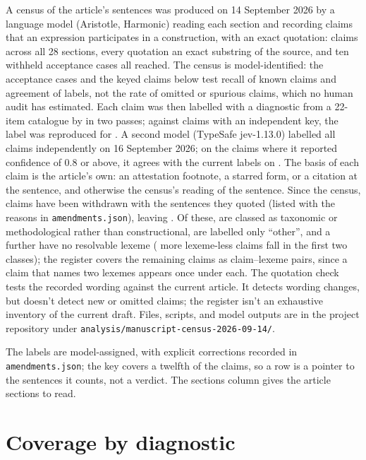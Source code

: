 \documentclass[12pt]{article}
\begin{document}
A census of the article's sentences was produced on 14 September 2026 by a language model (Aristotle, Harmonic) reading each section and recording claims that an expression participates in a construction, with an exact quotation: \censusClaims{} claims across all 28 sections, every quotation an exact substring of the source, and ten withheld acceptance cases all reached. The census is model-identified: the acceptance cases and the keyed claims below test recall of known claims and agreement of labels, not the rate of omitted or spurious claims, which no human audit has estimated. Each claim was then labelled with a diagnostic from a 22-item catalogue by  in two passes; against \keyedClaims{} claims with an independent key, the label was reproduced for \keyedAgree{}. A second model (TypeSafe jev-1.13.0) labelled all \censusClaims{} claims independently on 16 September 2026; on the \typesafeAccepted{} claims where it reported confidence of 0.8 or above, it agrees with the current labels on \typesafeAgree{}. The basis of each claim is the article's own: an attestation footnote, a starred form, or a citation at the sentence, and otherwise the census's reading of the sentence. Since the census, \withdrawnClaims{} claims have been withdrawn with the sentences they quoted (listed with the reasons in \texttt{amendments.json}), leaving \liveClaims{}. Of these, \taxonomicClaims{} are classed as taxonomic or methodological rather than constructional, \otherClaims{} are labelled only \enquote{other}, and a further \lexemelessOnly{} have no resolvable lexeme (\lexemelessOverlap{} more lexeme-less claims fall in the first two classes); the register covers the remaining \retainedClaims{} claims as \claimPairs{} claim--lexeme pairs, since a claim that names two lexemes appears once under each. The quotation check tests the recorded wording against the current article. It detects wording changes, but doesn't detect new or omitted claims; the register isn't an exhaustive inventory of the current draft. Files, scripts, and model outputs are in the project repository under \texttt{analysis/manuscript-census-2026-09-14/}.

The labels are model-assigned, with explicit corrections recorded in \texttt{amendments.json}; the key covers a twelfth of the claims, so a row is a pointer to the sentences it counts, not a verdict. The sections column gives the article sections to read.

\section{Coverage by diagnostic}
\end{document}
